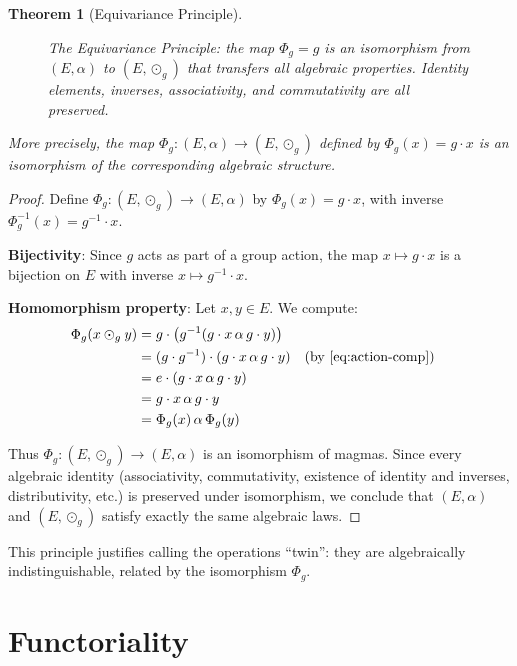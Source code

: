 \documentclass[11pt,a4paper,openany]{book}
\theoremstyle{plain}
\newtheorem{theorem}{Theorem}[chapter]
\theoremstyle{definition}
\newcommand{\twing}[1]{\odot_{#1}}
\newcommand{\actspace}{E}
\begin{document}
\begin{theorem}[Equivariance Principle]
\begin{figure}[ht]
\begin{tikzpicture}
\end{tikzpicture}
\caption{The Equivariance Principle: the map $\Phi_g = g$ is an isomorphism
from $(\actspace, \alpha)$ to $(\actspace, \twing{g})$ that transfers
\emph{all} algebraic properties. Identity elements, inverses, associativity,
and commutativity are all preserved.}
\label{fig:equivariance}
\end{figure}

More precisely, the map $\Phi_g: (\actspace, \alpha) \to (\actspace, \twing{g})$ defined by $\Phi_g(x) = g \cdot x$ is an isomorphism of the corresponding algebraic structure.
\end{theorem}

\begin{proof}
Define $\Phi_g : (\actspace, \twing{g}) \to (\actspace, \alpha)$ by $\Phi_g(x) = g \cdot x$, with inverse $\Phi_g^{-1}(x) = g^{-1} \cdot x$.

\textbf{Bijectivity}: Since $g$ acts as part of a group action, the map $x \mapsto g \cdot x$ is a bijection on $\actspace$ with inverse $x \mapsto g^{-1} \cdot x$.

\textbf{Homomorphism property}: Let $x, y \in \actspace$. We compute:
\begin{align*}
\Phi_g(x \twing{g} y) &= g \cdot \big(g^{-1}(g \cdot x \,\alpha\, g \cdot y)\big) \\
&= (g \cdot g^{-1}) \cdot (g \cdot x \,\alpha\, g \cdot y) && \text{(by \eqref{eq:action-comp})} \\
&= e \cdot (g \cdot x \,\alpha\, g \cdot y) \\
&= g \cdot x \,\alpha\, g \cdot y \\
&= \Phi_g(x) \,\alpha\, \Phi_g(y)
\end{align*}

Thus $\Phi_g : (\actspace, \twing{g}) \to (\actspace, \alpha)$ is an isomorphism of magmas. Since every algebraic identity (associativity, commutativity, existence of identity and inverses, distributivity, etc.) is preserved under isomorphism, we conclude that $(\actspace, \alpha)$ and $(\actspace, \twing{g})$ satisfy exactly the same algebraic laws.
\end{proof}

This principle justifies calling the operations ``twin'': they are algebraically indistinguishable, related by the isomorphism $\Phi_g$.


\chapter{Functoriality}
\label{ch:functoriality}
\end{document}
